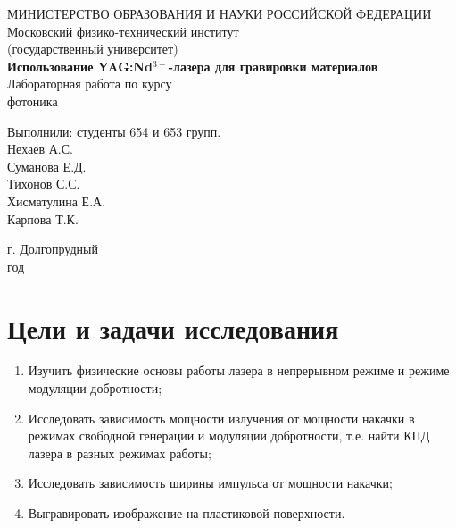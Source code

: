 \documentclass[a4paper, 12pt]{article}
\begin{document}
	\begin{titlepage}
		\begin{center}
		МИНИСТЕРСТВО ОБРАЗОВАНИЯ И НАУКИ РОССИЙСКОЙ ФЕДЕРАЦИИ\\
		\footnotesize{Московский физико-технический институт}\\
		\footnotesize{(государственный университет)}\\
		\vfill
		{\LARGE
		\textbf{Использование YAG:Nd$^{3+} $-лазера для гравировки материалов}\\
		}
		\vspace{1cm}
		Лабораторная работа по курсу\\
		фотоника
		\vfill
		\begin{flushright}
			Выполнили: студенты 654 и 653 групп.\\
			Нехаев А.С.\\
			Суманова Е.Д.\\
			Тихонов С.С.\\
			Хисматулина Е.А.\\
			Карпова Т.К.
		\end{flushright}
		\vfill
		г. Долгопрудный\\
		\the\year\:год
		\end{center}
	\end{titlepage}
	\newpage
	\tableofcontents
	\newpage
	\section{Цели и задачи исследования}
	\begin{enumerate}
		\item Изучить физические основы работы лазера в непрерывном режиме и режиме модуляции добротности;
		\item Исследовать зависимость мощности излучения от мощности накачки в режимах свободной генерации и модуляции добротности, т.е. найти КПД лазера в разных режимах работы;
		\item Исследовать зависимость ширины импульса от мощности накачки;
		\item Выгравировать изображение на пластиковой поверхности.	
	\end{enumerate}
	\newpage
\end{document}

